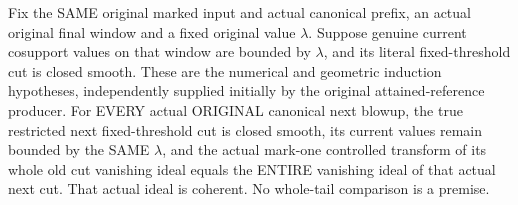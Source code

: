 \begin{theorem}
\label{hir:original-bounded-fixed-threshold-genuine-step-closure}
\leanok
{}
Fix the SAME original marked input and actual canonical prefix, an actual
original final window and a fixed original value $\lambda$. Suppose genuine
current cosupport values on that window are bounded by $\lambda$, and its
literal fixed-threshold cut is closed smooth. These are the numerical and
geometric induction hypotheses, independently supplied initially by the
original attained-reference producer. For EVERY actual ORIGINAL canonical
next blowup, the true restricted next fixed-threshold cut is closed smooth,
its current values remain bounded by the SAME $\lambda$, and the actual
mark-one controlled transform of its whole old cut vanishing ideal equals
the ENTIRE vanishing ideal of that actual next cut. That actual ideal is
coherent. No whole-tail comparison is a premise.
\end{theorem}
